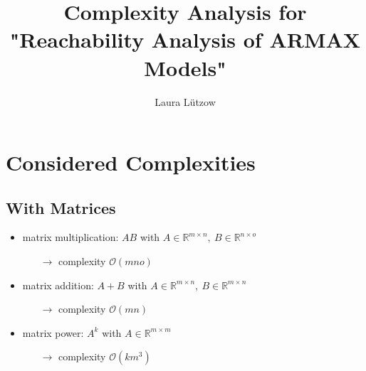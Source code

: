 \documentclass{article}
\title{\LARGE \bf
Complexity Analysis for "Reachability Analysis of ARMAX Models"
}
\author{Laura L\"utzow%
}
\begin{document}
\maketitle
\thispagestyle{empty}
\pagestyle{empty}



\section{Considered Complexities}
\subsection{With Matrices}
\begin{itemize}
    \item matrix multiplication: $AB$ with $A\in \mathbb{R}^{m \times n},~B\in \mathbb{R}^{n \times o}$
    \begin{itemize}
        \item[$\rightarrow$] complexity $\mathcal{O}(mno)$
    \end{itemize}
    \item matrix addition: $A+B$ with $A\in \mathbb{R}^{m \times n},~B\in \mathbb{R}^{m \times n}$
    \begin{itemize}
        \item[$\rightarrow$] complexity $\mathcal{O}(mn)$
    \end{itemize}    
    \item matrix power: $A^k$ with $A\in \mathbb{R}^{m \times m}$
    \begin{itemize}
        \item[$\rightarrow$] complexity $\mathcal{O}(km^3)$
    \end{itemize}   
\end{itemize}
\end{document}
